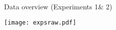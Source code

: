 \begin{frame}{Data overview (Experiments 1\& 2)}
	\begin{center}	
		\texttt{[image: expsraw.pdf]}
	\end{center}
\end{frame}